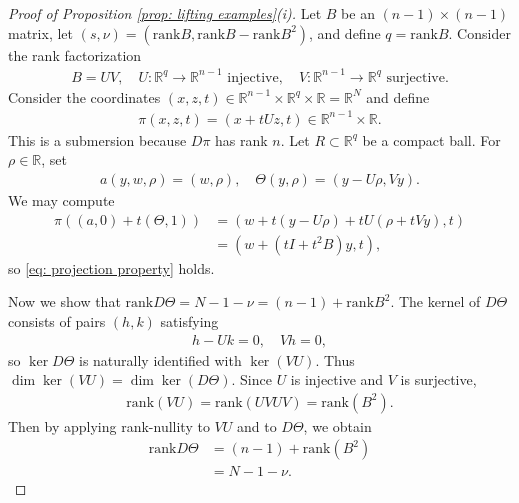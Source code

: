 \documentclass[10pt,a4paper]{amsart}
\def\R{\mathbb{R}}
\newcommand{\rank}{\mathrm{rank}}
\begin{document}
    \begin{proof}[Proof of Proposition \ref{prop: lifting examples}(i)]
        Let $B$ be an $(n-1)\times (n-1)$ matrix, let $(s,\nu) = (\rank B, \rank B - \rank B^2)$, and define $q = \rank B$. Consider the rank factorization 
        \begin{align}
            B = UV, \quad U : \R^q \to \R^{n-1} \text{ injective}, \quad V : \R^{n-1} \to \R^q\text{ surjective.}
         \end{align}
         Consider the coordinates $(x,z,t) \in \R^{n-1} \times \R^q \times \R = \R^{N}$ and define 
         \begin{align}
             \pi(x,z,t) = (x + tUz,t) \in \R^{n-1} \times \R.
         \end{align}
         This is a submersion because $D\pi$ has rank $n$. Let $R \subset \R^q$ be a compact ball. For $\rho \in \R$, set 
         \begin{align}
             a(y,w,\rho) = (w,\rho), \quad \Theta(y,\rho) = (y- U\rho,Vy).
         \end{align}
         We may compute 
         \begin{align}
             \pi((a,0) + t(\Theta,1)) &= (w + t(y-U\rho) + tU(\rho + tVy),t) \\
             &= (w + (tI +t^2B)y,t),
         \end{align}
         so \eqref{eq: projection property} holds.

         Now we show that $\rank D\Theta = N - 1 - \nu = (n-1) + \rank B^2$. The kernel of $D \Theta$ consists of pairs $(h,k)$ satisfying
         \begin{align}
            h - Uk = 0, \quad Vh=0,
         \end{align}
         so $\ker D\Theta$ is naturally identified with $\ker(VU)$. Thus $\dim\ker (VU) = \dim \ker(D\Theta)$.
         Since $U$ is injective and $V$ is surjective, 
         \begin{align}
             \rank(VU) = \rank(UVUV) = \rank(B^2).
         \end{align}
         Then by applying rank-nullity to $VU$ and to $D\Theta$, we obtain 
         \begin{align}
             \rank D\Theta &= (n-1) + \rank(B^2) \\
             &= N-1-\nu.
         \end{align}
    \end{proof}
\end{document}
